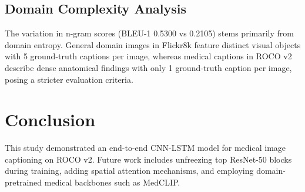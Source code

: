 \documentclass[11pt,a4paper]{article}
\begin{document}
\subsection{Domain Complexity Analysis}
The variation in n-gram scores (BLEU-1 0.5300 vs 0.2105) stems primarily from domain entropy. General domain images in Flickr8k feature distinct visual objects with 5 ground-truth captions per image, whereas medical captions in ROCO v2 describe dense anatomical findings with only 1 ground-truth caption per image, posing a stricter evaluation criteria.

\section{Conclusion}
This study demonstrated an end-to-end CNN-LSTM model for medical image captioning on ROCO v2. Future work includes unfreezing top ResNet-50 blocks during training, adding spatial attention mechanisms, and employing domain-pretrained medical backbones such as MedCLIP.
\end{document}
